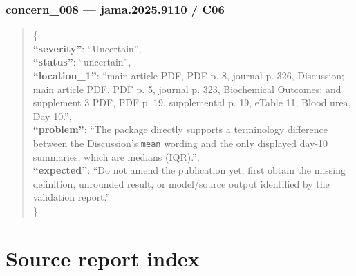 \documentclass[
  letterpaper,
  9pt]{extreport}
\begin{document}
\hypertarget{concern_008--jama20259110--c06}{%
\subsection{concern\_008 --- jama.2025.9110 /
C06}\label{concern_008--jama20259110--c06}}

\begin{quote}
\{\\
\textbf{``severity''}: ``Uncertain'',\\
\textbf{``status''}: ``uncertain'',\\
\textbf{``location\_1''}: ``main article PDF, PDF p. 8, journal p. 326,
Discussion; main article PDF, PDF p. 5, journal p. 323, Biochemical
Outcomes; and supplement 3 PDF, PDF p. 19, supplemental p. 19, eTable
11, Blood urea, Day 10.'',\\
\textbf{``problem''}: ``The package directly supports a terminology
difference between the Discussion's \texttt{mean} wording and the only
displayed day-10 summaries, which are medians (IQR).'',\\
\textbf{``expected''}: ``Do not amend the publication yet; first obtain
the missing definition, unrounded result, or model/source output
identified by the validation report.''\\
\}
\end{quote}

\hypertarget{source-report-index}{%
\chapter{Source report index}\label{source-report-index}}
\end{document}

